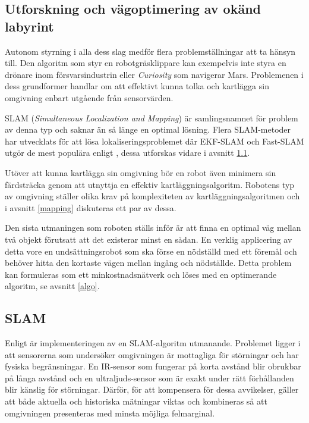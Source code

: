 \documentclass[11pt]{article}
\begin{document}
\begin{flushleft}
\pagebreak
\section{Utforskning och vägoptimering av okänd labyrint}
Autonom styrning i alla dess slag medför flera problemställningar att ta hänsyn till. Den algoritm som styr en robotgräsklippare kan exempelvis inte styra en drönare inom försvarsindustrin eller \emph{Curiosity} som navigerar Mars. Problemenen i dess grundformer handlar om att effektivt kunna tolka och kartlägga sin omgivning enbart utgående från sensorvärden.

SLAM (\emph{Simultaneous Localization and Mapping}) är samlingsnamnet för problem av denna typ och saknar än så länge en optimal lösning. Flera SLAM-metoder har utvecklats för att lösa lokaliseringsproblemet där EKF-SLAM och Fast-SLAM utgör de mest populära enligt \cite{rat}, dessa utforskas vidare i avsnitt \ref{slam}.

Utöver att kunna kartlägga sin omgivning bör en robot även minimera sin färdsträcka genom att utnyttja en effektiv kartläggningsalgoritm. Robotens typ av omgivning ställer olika krav på komplexiteten av kartläggningsalgoritmen och i avsnitt \ref{mapping} diskuteras ett par av dessa.

Den sista utmaningen som roboten ställs inför är att finna en optimal väg mellan två objekt förutsatt att det existerar minst en sådan. En verklig applicering av detta vore en undsättningsrobot som ska förse en nödställd med ett föremål och behöver hitta den kortaste vägen mellan ingång och nödställde. Detta problem kan formuleras som ett minkostnadsnätverk och löses med en optimerande algoritm, se avsnitt \ref{algo}. 

\subsection{SLAM}
\label{slam}
Enligt \cite{ekf} är implementeringen av en SLAM-algoritm utmanande. Problemet ligger i att sensorerna som undersöker omgivningen är mottagliga för störningar och har fysiska begränsningar. En IR-sensor som fungerar på korta avstånd blir obrukbar på långa avstånd och en ultraljuds-sensor som är exakt under rätt förhållanden blir känslig för störningar. Därför, för att kompensera för dessa avvikelser, gäller att både aktuella och historiska mätningar viktas och kombineras så att omgivningen presenteras med minsta möjliga felmarginal. 


\end{flushleft}
\end{document}
